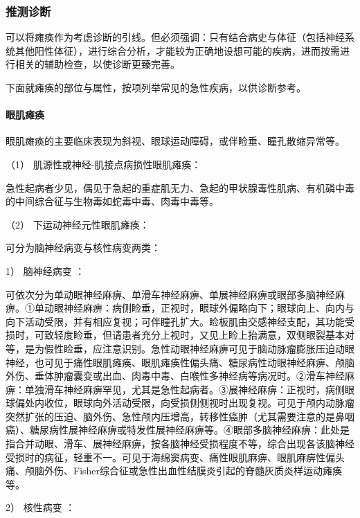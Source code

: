 \subsubsection{推测诊断}

可以将瘫痪作为考虑诊断的引线。但必须强调：只有结合病史与体征（包括神经系统其他阳性体征），进行综合分析，才能较为正确地设想可能的疾病，进而按需进行相关的辅助检查，以使诊断更臻完善。

下面就瘫痪的部位与属性，按项列举常见的急性疾病，以供诊断参考。

\paragraph{眼肌瘫痪}

眼肌瘫痪的主要临床表现为斜视、眼球运动障碍，或伴睑垂、瞳孔散缩异常等。

\hypertarget{text00018.htmlux5cux23CHP1-6-2-3-1-1}{}
（1） 肌源性或神经-肌接点病损性眼肌瘫痪：

急性起病者少见，偶见于急起的重症肌无力、急起的甲状腺毒性肌病、有机磷中毒的中间综合征与生物毒如蛇毒中毒、肉毒中毒等。

\hypertarget{text00018.htmlux5cux23CHP1-6-2-3-1-2}{}
（2） 下运动神经元性眼肌瘫痪：

可分为脑神经病变与核性病变两类：

\hypertarget{text00018.htmlux5cux23CHP1-6-2-3-1-2-1}{}
1） 脑神经病变 ：

可依次分为单动眼神经麻痹、单滑车神经麻痹、单展神经麻痹或眼部多脑神经麻痹。①单动眼神经麻痹：病侧睑垂，正视时，眼球外偏略向下；眼球向上、向内与向下活动受限，并有相应复视；可伴瞳孔扩大。睑板肌由交感神经支配，其功能受损时，可致轻度睑垂，但请患者充分上视时，又见上睑上抬满意，双侧眼裂基本对等，是为假性睑垂，应注意识别。急性动眼神经麻痹可见于脑动脉瘤膨胀压迫动眼神经，也可见于痛性眼肌瘫痪、眼肌瘫痪性偏头痛、糖尿病性动眼神经麻痹、颅脑外伤、垂体肿瘤囊变或出血、肉毒中毒、白喉性多神经病等病况时。②滑车神经麻痹：单独滑车神经麻痹罕见，尤其是急性起病者。③展神经麻痹：正视时，病侧眼球偏处内收位，眼球向外活动受限，向受损侧侧视时出现复视。可见于颅内动脉瘤突然扩张的压迫、脑外伤、急性颅内压增高，转移性癌肿（尤其需要注意的是鼻咽癌）、糖尿病性展神经麻痹或特发性展神经麻痹等。④眼部多脑神经麻痹：此处是指合并动眼、滑车、展神经麻痹，按各脑神经受损程度不等，综合出现各该脑神经受损时的病征，轻重不一。可见于海绵窦病变、痛性眼肌麻痹、眼肌麻痹性偏头痛、颅脑外伤、Fisher综合征或急性出血性结膜炎引起的脊髓灰质炎样运动瘫痪等。

\hypertarget{text00018.htmlux5cux23CHP1-6-2-3-1-2-2}{}
2） 核性病变 ：

